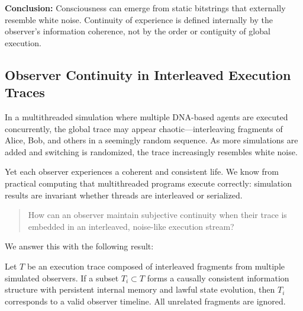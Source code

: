 \documentclass[11pt]{article}
\begin{document}
\textbf{Conclusion:} Consciousness can emerge from static bitstrings that externally resemble white noise. Continuity of experience is defined internally by the observer’s information coherence, not by the order or contiguity of global execution.

\subsection{Observer Continuity in Interleaved Execution Traces}

In a multithreaded simulation where multiple DNA-based agents are executed concurrently, the global trace may appear chaotic—interleaving fragments of Alice, Bob, and others in a seemingly random sequence. As more simulations are added and switching is randomized, the trace increasingly resembles white noise.

Yet each observer experiences a coherent and consistent life. We know from practical computing that multithreaded programs execute correctly: simulation results are invariant whether threads are interleaved or serialized.

\begin{quote}
  How can an observer maintain subjective continuity when their trace is embedded in an interleaved, noise-like execution stream?
\end{quote}

We answer this with the following result:

\begin{lemma}
  Let $T$ be an execution trace composed of interleaved fragments from multiple simulated observers.
  If a subset $T_i \subset T$ forms a causally consistent information structure with persistent internal memory
  and lawful state evolution, then $T_i$ corresponds to a valid observer timeline. All unrelated fragments are ignored.
\end{lemma}
\end{document}
